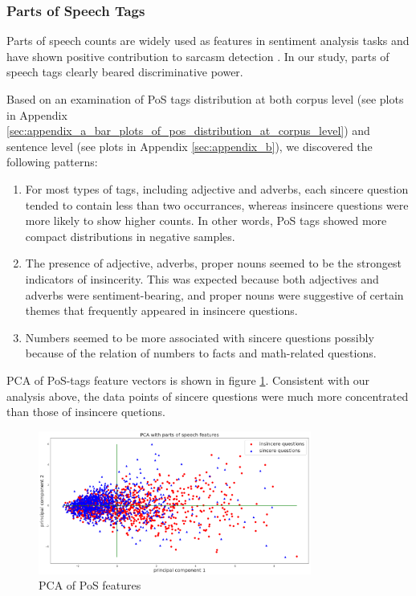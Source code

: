 \documentclass[12pt]{diazessay} %
\begin{document}

\subsubsection{Parts of Speech Tags} %
\label{ssub:parts_of_speech_tags}

Parts of speech counts are widely used as features in sentiment analysis tasks \citep{medhat2014} and have shown positive contribution to sarcasm detection \citep{barbosa2010}. In our study, parts of speech tags clearly beared discriminative power. 

Based on an examination of PoS tags distribution at both corpus level (see plots in Appendix \ref{sec:appendix_a_bar_plots_of_pos_distribution_at_corpus_level}) and sentence level (see plots in Appendix \ref{sec:appendix_b}), we discovered the following patterns: 

\begin{enumerate}
    \item For most types of tags, including adjective and adverbs, each sincere question tended to contain less than two occurrances, whereas insincere questions were more likely to show higher counts. In other words, PoS tags showed more compact distributions in negative samples. 
    \item The presence of adjective, adverbs, proper nouns seemed to be the strongest indicators of insincerity. This was expected because both adjectives and adverbs were sentiment-bearing, and proper nouns were suggestive of certain themes that frequently appeared in insincere questions. 
    \item Numbers seemed to be more associated with sincere questions possibly because of the relation of numbers to facts and math-related questions. 
\end{enumerate}

PCA of PoS-tags feature vectors is shown in figure \ref{figure:pospca}. Consistent with our analysis above, the data points of sincere questions were much more concentrated than those of insincere quetions.  

\begin{figure}[ht]
    \includegraphics[width=0.8\textwidth, center]{graphs/pca/2Dpos.png}
    
    \medskip
    \small
    \caption{PCA of PoS features} 
    \label{figure:pospca}
\end{figure}
\end{document}
